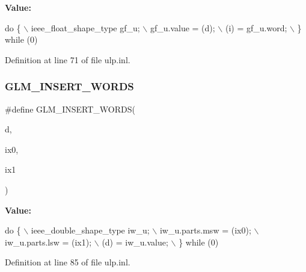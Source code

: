{\bfseries Value\+:}
\begin{DoxyCode}
\textcolor{keywordflow}{do} \{                                    \(\backslash\)
        ieee\_float\_shape\_type gf\_u;         \(\backslash\)
        gf\_u.value = (d);                   \(\backslash\)
        (i) = gf\_u.word;                    \(\backslash\)
    \} \textcolor{keywordflow}{while} (0)
\end{DoxyCode}


Definition at line 71 of file ulp.\+inl.

\mbox{\label{ulp_8inl_ac4ec14cb5c94f0ca1d594457ee17636f}} 
\subsubsection{\texorpdfstring{G\+L\+M\+\_\+\+I\+N\+S\+E\+R\+T\+\_\+\+W\+O\+R\+DS}{GLM\_INSERT\_WORDS}}
{\footnotesize\ttfamily \#define G\+L\+M\+\_\+\+I\+N\+S\+E\+R\+T\+\_\+\+W\+O\+R\+DS(\begin{DoxyParamCaption}\item[{}]{d,  }\item[{}]{ix0,  }\item[{}]{ix1 }\end{DoxyParamCaption})}

{\bfseries Value\+:}
\begin{DoxyCode}
\textcolor{keywordflow}{do} \{                                    \(\backslash\)
        ieee\_double\_shape\_type iw\_u;        \(\backslash\)
        iw\_u.parts.msw = (ix0);             \(\backslash\)
        iw\_u.parts.lsw = (ix1);             \(\backslash\)
        (d) = iw\_u.value;                   \(\backslash\)
    \} \textcolor{keywordflow}{while} (0)
\end{DoxyCode}


Definition at line 85 of file ulp.\+inl.

\mbox{\label{ulp_8inl_ab01ab8df0632f4a5f05e00f570e6b873}} 
